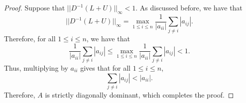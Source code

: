 \documentclass[12pt]{article}
\begin{document}
\begin{enumerate}[leftmargin=0em]
\begin{proof}
        \bigskip 

        \noindent Suppose that ${||D^{-1}(L+U)||}_{\infty}<1$. As discussed before, we have that
        \[{||D^{-1}(L+U)||}_{\infty}= \max_{1\leq i\leq n}\frac{1}{|a_{ii}|}\sum_{j\neq i}|a_{ij}|.\]
        Therefore, for all $1\leq i \leq n$, we have that
        \[\frac{1}{|a_{ii}|}\sum_{j\neq i}|a_{ij}|\leq \max_{1\leq i\leq n}\frac{1}{|a_{ii}|}\sum_{j\neq i}|a_{ij}|<1.\]
        Thus, multiplying by $a_{ii}$ gives that for all $1\leq i\leq n$,
        \[\sum_{j\neq i}|a_{ij}|<|a_{ii}|.\]
        Therefore, $A$ is strictly diagonally dominant, which completes the proof.
    \end{proof}
\end{enumerate}
\end{document}

